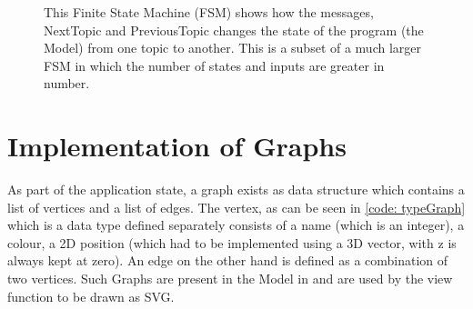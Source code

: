 \begin{figure}[h] %
\centering %
\caption{This Finite State Machine (FSM) 
        shows how the messages, NextTopic and PreviousTopic
        changes the state of the program (the Model) from
        one topic to another. This is a subset of a much larger
        FSM in which the number of states and inputs are greater
        in number.
        }
\label{fig:my_label}
\end{figure}
\section{Implementation of Graphs}
As part of the application state, a graph exists as data structure which contains a list of
vertices and a list of edges. The vertex, as can be seen in \autoref{code:
typeGraph} which is a data type defined separately consists of a name (which is
an integer), a colour, a 2D position (which had to be implemented using a 3D
vector, with z is always kept at zero).  An edge on the other hand is defined
as a combination of two vertices. Such Graphs are present in the Model in and
are used by the view function to be drawn as SVG.

